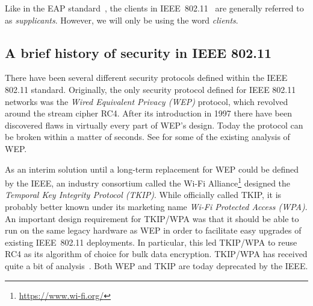 Like in the EAP standard~\cite{IETF:RFC3748:EAP},
the clients in IEEE~802.11~\cite{IEEE:2012:802.11} are generally referred to as \emph{supplicants}.  
However,
we will only be using the word \emph{clients}.

\subsection{A brief history of security in IEEE 802.11}\label{sec:802.11:security_history}
There have been several different security protocols defined within the IEEE 802.11 standard.
Originally,
the only security protocol defined for IEEE 802.11 networks was the \emph{Wired Equivalent Privacy (WEP)} protocol,
which revolved around the stream cipher RC4.
After its introduction in 1997 there have been discovered flaws in virtually every part of WEP's design.
Today the protocol can be broken within a matter of seconds.
See \cite{Walker:2000:WEP_unsafe,SAC:FluManSha01,BorisovGW:2001:insecurity_802.11,NDSS:StuIoaRub02,Cam-WingetHWW:2003:Flaws_802.11_link_protocol,StubblefieldIR:2004:WEP_802.11b_attack,MishraPAF:2004:802.11_issues_survey,SP:BitHanLac06,EPRINT:Tews07,WISA:TewWeiPys07,Tews:2009:PAA,MoriiT:2011:RC4_WPA,FSE:SSVV13}
for some of the existing analysis of WEP.



As an interim solution until a long-term replacement for WEP could be defined by the IEEE,
an industry consortium called the Wi-Fi Alliance\footnote{\url{https://www.wi-fi.org/}} designed the \emph{Temporal Key Integrity Protocol (TKIP)}.
While officially called TKIP,
it is probably better known under its marketing name \emph{Wi-Fi Protected Access (WPA)}.
An important design requirement for TKIP/WPA was that it should be able to run on the same legacy hardware as WEP in order to facilitate easy upgrades of existing IEEE~802.11 deployments.
In particular,
this led TKIP/WPA to reuse RC4 as its algorithm of choice for bulk data encryption.
TKIP/WPA has received quite a bit of analysis~\cite{Moen:2004:WPA_hash_weakness,Wool:2004:fragility_of_Michael,Tews:2009:PAA,EC:SepVauVua11,HalvorsenHEM:2009:improved_TKIP_attacks,MoriiT:2011:RC4_WPA,TodoOOM:2012:Falsification_attacks_TKIP,ASIACCS:VanPie13,FSE:GMMPS14,FSE:PatPoeSch14,FSE:ItoMiy15,VanhoefP:2016:Biases_belong_us_TKIP_TLS}.
Both WEP and TKIP are today deprecated by the IEEE.


